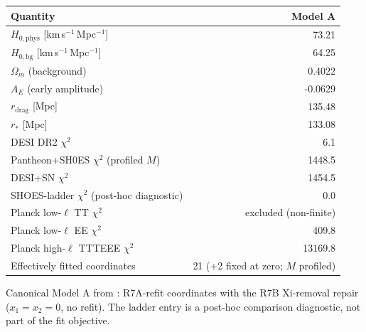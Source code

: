 \begin{tabular}{lr}
\toprule
Quantity & Model A \\
\midrule
$H_{0,\mathrm{phys}}$ [km\,s$^{-1}$\,Mpc$^{-1}$] & 73.21 \\
$H_{0,\mathrm{bg}}$ [km\,s$^{-1}$\,Mpc$^{-1}$] & 64.25 \\
$\Omega_{m}$ (background) & 0.4022 \\
$A_{E}$ (early amplitude) & -0.0629 \\
$r_{\mathrm{drag}}$ [Mpc] & 135.48 \\
$r_{*}$ [Mpc] & 133.08 \\
DESI DR2 $\chi^{2}$ & 6.1 \\
Pantheon+SH0ES $\chi^{2}$ (profiled $M$) & 1448.5 \\
DESI+SN $\chi^{2}$ & 1454.5 \\
SHOES-ladder $\chi^{2}$ (post-hoc diagnostic) & 0.0 \\
Planck low-$\ell$ TT $\chi^{2}$ & excluded (non-finite) \\
Planck low-$\ell$ EE $\chi^{2}$ & 409.8 \\
Planck high-$\ell$ TTTEEE $\chi^{2}$ & 13169.8 \\
Effectively fitted coordinates & 21 (+2 fixed at zero; $M$ profiled) \\
\bottomrule
\end{tabular}

{\small Canonical Model A from : R7A-refit coordinates with the R7B Xi-removal repair ($x_{1}=x_{2}=0$, no refit). The ladder entry is a post-hoc comparison diagnostic, not part of the fit objective.\par}

